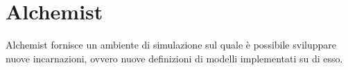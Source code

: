 \documentclass[12pt,a4paper,openright,twoside]{report}
\begin{document}
\tableofcontents

\rhead[\fancyplain{}{\bfseries\leftmark}]{\fancyplain{}{\bfseries\thepage}}

\clearpage{\pagestyle{empty}\cleardoublepage}

\listoffigures

\clearpage{\pagestyle{empty}\cleardoublepage}


\clearpage{\pagestyle{empty}\cleardoublepage}

 \lstlistoflistings

\chapter{Alchemist}
\lhead[\fancyplain{}{\bfseries\thepage}]{\fancyplain{}{\bfseries\rightmark}}
Alchemist fornisce un ambiente di simulazione sul quale \`e possibile sviluppare nuove incarnazioni, ovvero nuove definizioni di modelli implementati su di esso.

\end{document}
